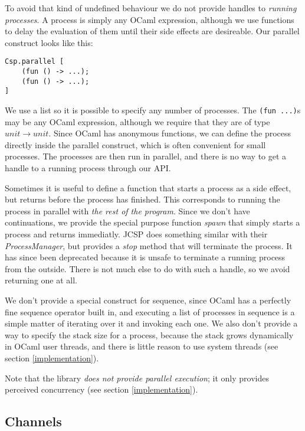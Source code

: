 \documentclass[a4paper,12pt]{article}
\begin{document}
To avoid that kind of undefined behaviour we do not provide handles to 
\emph{running processes}.
A process is simply any OCaml expression, although we use functions to delay the 
evaluation of them until their side effects are desireable. 
Our parallel construct looks like this:

\begin{verbatim}
Csp.parallel [
    (fun () -> ...);
    (fun () -> ...);
]
\end{verbatim}

We use a list so it is possible to specify any number of processes. The 
\verb|(fun ...)|s may be any OCaml expression, although we require that they are of type
$unit \to unit$. Since OCaml has anonymous functions, we can define the process directly 
inside the parallel construct, which is often convenient for small processes. The processes
are then run in parallel, and there is no way to get a handle to a running process
through our API.

Sometimes it is useful to define a function that starts a process as a side effect, but
returns before the process has finished. This corresponds to running the process in 
parallel with \emph{the rest of the program}. Since we don't have continuations, we 
provide the special purpose function \emph{spawn} that simply starts a process
and returns
immediatly. JCSP does something similar with their \emph{ProcessManager}, but provides a
\emph{stop} method that will terminate the process. It has since been deprecated because
it is unsafe to terminate a running process from the outside. There is not much else to 
do with such a handle, so we avoid returning one at all.

We don't provide a special construct for sequence, since OCaml has a perfectly fine 
sequence operator built in, and executing a list of processes in sequence is a simple
matter of iterating over it and invoking each one. We also don't provide a way to specify 
the stack size for a process, because the stack grows dynamically in OCaml user threads, 
and there is little reason to use system threads (see section \ref{implementation}).

Note that the library \emph{does not provide parallel execution}; it only provides 
perceived concurrency (see section \ref{implementation}).

\subsection{Channels}
\end{document}
